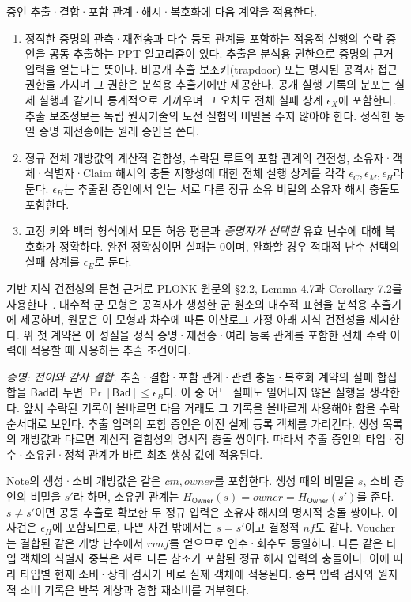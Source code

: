 증인 추출·결합·포함 관계·해시·복호화에 다음 계약을 적용한다.
\begin{enumerate}
 \item 정직한 증명의 관측·재전송과 다수 등록 관계를 포함하는
 적응적 실행의 수락 증인을 공동 추출하는 PPT 알고리즘이 있다.
 추출은 분석용 권한으로 증명의 근거 입력을 얻는다는 뜻이다.
 비공개 추출 보조키(trapdoor) 또는 명시된 공격자 접근 권한을 가지며
 그 권한은 분석용 추출기에만 제공한다. 공개 실행 기록의 분포는 실제 실행과
 같거나 통계적으로 가까우며 그 오차도 전체 실패 상계
 $\epsilon_X$에 포함한다. 추출 보조정보는 독립 원시기술의
 도전 실험의 비밀을 주지 않아야 한다. 정직한 동일 증명
 재전송에는 원래 증인을 쓴다.
 \item 정규 전체 개방값의 계산적 결합성, 수락된 루트의 포함
 관계의 건전성, 소유자·객체·식별자·Claim 해시의 충돌 저항성에
 대한 전체 실행 상계를 각각 $\epsilon_C,\epsilon_M,\epsilon_H$라
 둔다. $\epsilon_H$는 추출된 증인에서 얻는 서로 다른 정규
 소유 비밀의 소유자 해시 충돌도 포함한다.
 \item 고정 키와 벡터 형식에서 모든 허용 평문과 \emph{증명자가 선택한}
 유효 난수에 대해 복호화가 정확하다. 완전 정확성이면 실패는 0이며,
 완화할 경우 적대적 난수 선택의 실패 상계를 $\epsilon_E$로 둔다.
\end{enumerate}

기반 지식 건전성의 문헌 근거로 PLONK 원문의 \S2.2,
Lemma 4.7과 Corollary 7.2를 사용한다~\cite{gabizon-plonk-2019}.
대수적 군 모형은 공격자가 생성한 군 원소의 대수적 표현을
분석용 추출기에 제공하며, 원문은 이 모형과 차수에 따른
이산로그 가정 아래 지식 건전성을 제시한다.
위 첫 계약은 이 성질을 정직 증명·재전송·여러 등록 관계를
포함한 전체 수락 이력에 적용할 때 사용하는 추출 조건이다.

\emph{증명: 전이와 감사 결합.}
추출·결합·포함 관계·관련 충돌·복호화 계약의 실패 합집합을
$\mathsf{Bad}$라 두면 $\Pr[\mathsf{Bad}]\leq\epsilon_B$다.
이 중 어느 실패도 일어나지 않은 실행을 생각한다.
앞서 수락된 기록이 올바르면 다음 거래도 그 기록을
올바르게 사용해야 함을 수락 순서대로 보인다.
추출 입력의 포함 증인은 이전 실제 등록 객체를 가리킨다.
생성 목록의 개방값과 다르면 계산적 결합성의 명시적 충돌 쌍이다.
따라서 추출 증인의 타입·정수·소유권·정책 관계가 바로 최초
생성 값에 적용된다.

Note의 생성·소비 개방값은 같은 $cm,owner$를 포함한다.
생성 때의 비밀을 $s$, 소비 증인의 비밀을 $s'$라 하면,
소유권 관계는 $H_{\mathsf{Owner}}(s)=owner=H_{\mathsf{Owner}}(s')$를 준다.
$s\ne s'$이면 공동 추출로 확보한 두 정규 입력은 소유자 해시의
명시적 충돌 쌍이다. 이 사건은 $\epsilon_H$에 포함되므로,
나쁜 사건 밖에서는 $s=s'$이고 결정적 $nf$도 같다.
Voucher는 결합된 같은
개방 난수에서 $rvnf$를 얻으므로 인수·회수도 동일하다.
다른 같은 타입 객체의 식별자 중복은 서로 다른 참조가 포함된
정규 해시 입력의 충돌이다. 이에 따라 타입별 현재 소비·상태
검사가 바로 실제 객체에 적용된다. 중복 입력 검사와 원자적
소비 기록은 반복 계상과 경합 재소비를 거부한다.

